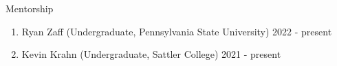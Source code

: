 \begin{rSection}{Mentorship}
	\begin{enumerate}
		\item Ryan Zaff (Undergraduate, Pennsylvania State University) \hfill 2022 - present
		\item Kevin Krahn (Undergraduate, Sattler College) \hfill 2021 - present
	\end{enumerate}
\end{rSection}
